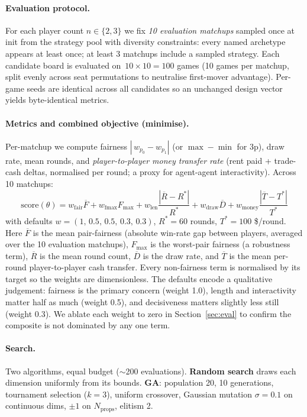 \documentclass[10pt]{article}
\begin{document}
\paragraph{Evaluation protocol.} For each player count $n\in\{2,3\}$ we
fix \emph{10 evaluation matchups} sampled once at init from the strategy
pool with diversity constraints: every named archetype appears at least
once; at least 3 matchups include a sampled strategy. Each candidate
board is evaluated on $\,10\!\times\!10 = 100$ games (10 games per
matchup, split evenly across seat permutations to neutralise first-mover
advantage). Per-game seeds are identical across all candidates so an
unchanged design vector yields byte-identical metrics.

\paragraph{Metrics and combined objective (minimise).} Per-matchup we
compute fairness $|\,w_{p_0}\!-\!w_{p_1}|$ (or $\max\!-\!\min$ for 3p),
draw rate, mean rounds, and \emph{player-to-player money transfer rate}
(rent paid + trade-cash deltas, normalised per round; a proxy for
agent-agent interactivity). Across 10 matchups:
\begin{equation}\label{eq:score}
\text{score}(\theta) =
   w_{\text{fair}} \overline{F} +
   w_{\text{fmax}} F_{\max} +
   w_{\text{len}}  \frac{|\overline{R}\!-\!R^*|}{R^*} +
   w_{\text{draw}}\overline{D} +
   w_{\text{money}}\frac{|\overline{T}\!-\!T^*|}{T^*}
\end{equation}
with defaults $w=(1,\,0.5,\,0.5,\,0.3,\,0.3)$, $R^*{=}60$ rounds,
$T^*{=}100$ \$/round. Here $\overline{F}$ is the mean pair-fairness
(absolute win-rate gap between players, averaged over the 10 evaluation
matchups), $F_{\max}$ is the worst-pair fairness (a robustness term),
$\overline{R}$ is the mean round count, $\overline{D}$ is the draw rate,
and $\overline{T}$ is the mean per-round player-to-player cash transfer.
Every non-fairness term is normalised by its target so the weights are
dimensionless. The defaults encode a qualitative judgement: fairness is
the primary concern (weight 1.0), length and interactivity matter half
as much (weight 0.5), and decisiveness matters slightly less still
(weight 0.3). We ablate each weight to zero in Section~\ref{sec:eval}
to confirm the composite is not dominated by any one term.

\paragraph{Search.} Two algorithms, equal budget ($\sim$200 evaluations).
\textbf{Random search} draws each dimension uniformly from its bounds.
\textbf{GA}: population 20, 10 generations, tournament selection ($k{=}3$),
uniform crossover, Gaussian mutation $\sigma{=}0.1$ on continuous dims,
$\pm 1$ on $N_{\text{props}}$, elitism 2.
\end{document}
